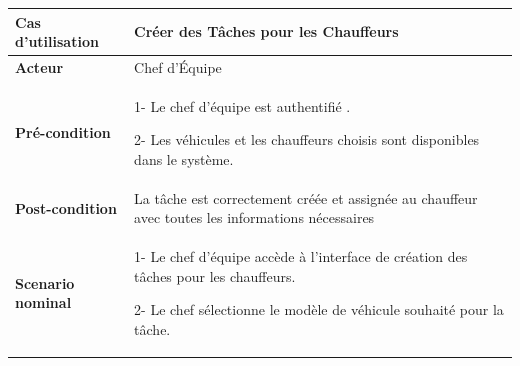 \begin{table}[H]
  \centering
  \renewcommand{\arraystretch}{1.2}
  \begin{tabular}{|p{4cm}|p{9cm}|}
    \hline
    \textbf{Cas d'utilisation} & Créer des Tâches pour les Chauffeurs                                                              \\
    \hline
    \textbf{Acteur}            & Chef d'Équipe                                                                                     \\
    \hline
    \textbf{Pré-condition}     & 1- Le chef d'équipe est authentifié .\newline

    2- Les véhicules et les chauffeurs choisis sont disponibles dans le système.                                                   \\
    \hline
    \textbf{Post-condition}    & La tâche est correctement créée et assignée au chauffeur avec toutes les informations nécessaires \\
    \hline
    \textbf{Scenario nominal}  & 1- Le chef d'équipe accède à l'interface de création des tâches pour les chauffeurs.\newline


    2- Le chef sélectionne le modèle de véhicule souhaité pour la tâche.                                                           \\
  \end{tabular}
\end{table}


